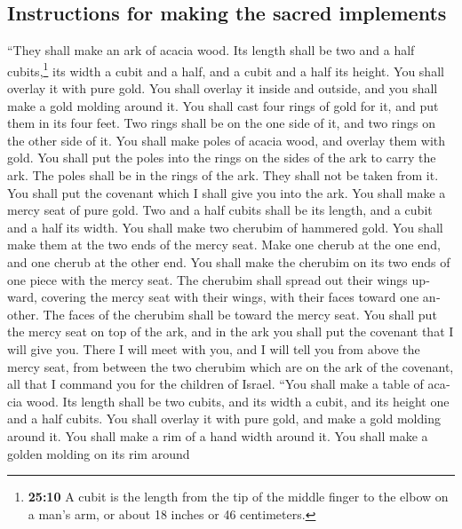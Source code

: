 \begin{paracol}{2}
\begin{otherlanguage}{english}
\hypertarget{instructions-for-making-the-sacred-implements}{%
\subsection{Instructions for making the sacred
implements}\label{instructions-for-making-the-sacred-implements}}

 ``They shall make an ark of acacia wood. Its length
shall be two and a half cubits,\footnote{\textbf{25:10} A cubit is the
  length from the tip of the middle finger to the elbow on a man's arm,
  or about 18 inches or 46 centimeters.} its width a cubit and a half,
and a cubit and a half its height.  You shall overlay it
with pure gold. You shall overlay it inside and outside, and you shall
make a gold molding around it.  You shall cast four rings
of gold for it, and put them in its four feet. Two rings shall be on the
one side of it, and two rings on the other side of it. 
You shall make poles of acacia wood, and overlay them with gold.
 You shall put the poles into the rings on the sides of
the ark to carry the ark.  The poles shall be in the
rings of the ark. They shall not be taken from it.  You
shall put the covenant which I shall give you into the ark.
 You shall make a mercy seat of pure gold. Two and a half
cubits shall be its length, and a cubit and a half its width.
 You shall make two cherubim of hammered gold. You shall
make them at the two ends of the mercy seat.  Make one
cherub at the one end, and one cherub at the other end. You shall make
the cherubim on its two ends of one piece with the mercy seat.
 The cherubim shall spread out their wings upward,
covering the mercy seat with their wings, with their faces toward one
another. The faces of the cherubim shall be toward the mercy seat.
 You shall put the mercy seat on top of the ark, and in
the ark you shall put the covenant that I will give you. 
There I will meet with you, and I will tell you from above the mercy
seat, from between the two cherubim which are on the ark of the
covenant, all that I command you for the children of Israel.
 ``You shall make a table of acacia wood. Its length
shall be two cubits, and its width a cubit, and its height one and a
half cubits.  You shall overlay it with pure gold, and
make a gold molding around it.  You shall make a rim of a
hand width around it. You shall make a golden molding on its rim around

\end{otherlanguage}
\end{paracol}
